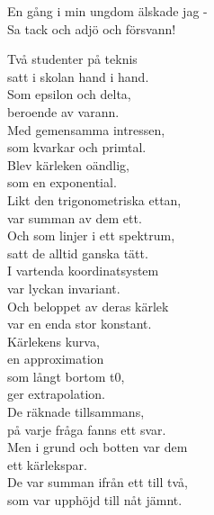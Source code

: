 \documentclass[a6paper, 10pt, twoside]{article}
\begin{document}
\newpage
\noindent
\begin{center}
\end{center}
\begin{lyrics}
En gång i min ungdom älskade jag - \\
Sa tack och adjö och försvann!
\end{lyrics}
\vspace{20pt}
\begin{center}
\end{center}
\begin{lyrics}
Två studenter på teknis \\
satt i skolan hand i hand. \\
Som epsilon och delta, \\
beroende av varann. \\
Med gemensamma intressen, \\
som kvarkar och primtal. \\
Blev kärleken oändlig, \\
som en exponential. 
\vspace{5pt}\\
Likt den trigonometriska ettan, \\
var summan av dem ett. \\
Och som linjer i ett spektrum, \\
satt de alltid ganska tätt. \\
I vartenda koordinatsystem \\
var lyckan invariant. \\
Och beloppet av deras kärlek \\
var en enda stor konstant. \\
\noindent
Kärlekens kurva, \\
en approximation \\
som långt bortom t0, \\
ger extrapolation. \\
De räknade tillsammans, \\
på varje fråga fanns ett svar. \\
Men i grund och botten var dem \\
ett kärlekspar.
\vspace{5pt}\\
De var summan ifrån ett till två, \\
som var upphöjd till nåt jämnt. \\

\end{lyrics}
\end{document}
